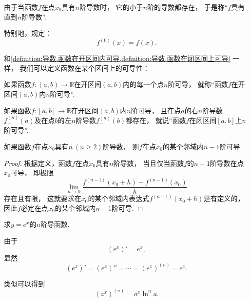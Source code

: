 由于当函数\(f\)在点\(x_0\)具有\(n\)阶导数时，
它的小于\(n\)阶的导数都存在，
于是称“\(f\)具有直到\(n\)阶导数”.

特别地，规定：\begin{equation}
	f^{(0)}(x) = f(x).
\end{equation}

和\cref{definition:导数.函数在开区间内可导,definition:导数.函数在闭区间上可导} 一样，
我们可以定义函数在某个区间上的可导性：
\begin{definition}
如果函数\(f\colon(a,b)\to\mathbb{R}\)在开区间\((a,b)\)内的每一个点\(n\)阶可导，
就称“函数\(f\)在开区间\((a,b)\)内\(n\)阶可导”.
\end{definition}
\begin{definition}
如果函数\(f\colon[a,b]\to\mathbb{R}\)在开区间\((a,b)\)内\(n\)阶可导，
且在点\(a\)的右\(n\)阶导数\(f^{(n)}_+(a)\)及在点\(b\)的左\(n\)阶导数\(f^{(n)}_-(b)\)都存在，
就说“函数\(f\)在闭区间\([a,b]\)上\(n\)阶可导”.
\end{definition}

\begin{proposition}\label{theorem:高阶导数.在一点高阶可导是在该点某邻域内低阶可导的充分条件}
如果函数\(f\)在点\(x_0\)具有\(n\ (n\geq2)\)阶导数，
则\(f\)在点\(x_0\)的某个邻域内\(n-1\)阶可导.
\begin{proof}
根据定义，函数\(f\)在点\(x_0\)具有\(n\)阶导数，
当且仅当函数\(f\)的\(n-1\)阶导数在点\(x_0\)可导，
即极限\begin{equation*}
	\lim_{h\to0} \frac{f^{(n-1)}(x_0+h) - f^{(n-1)}(x_0)}{h}
\end{equation*}存在且有限，
这就要求在\(x_0\)的某个邻域内表达式\(f^{(n-1)}(x_0+h)\)是有定义的，
因此\(f\)必定在点\(x_0\)的某个邻域内\(n-1\)阶可导.
\end{proof}
\end{proposition}

\begin{example}
求\(y = e^x\)的\(n\)阶导函数.
\begin{solution}
由于\begin{equation*}
	(e^x)' = e^x,
\end{equation*}
显然\begin{equation*}
	(e^x)'
	= (e^x)''
	= \dotsb
	= (e^x)^{(n)}
	= e^x.
\end{equation*}
\end{solution}
\end{example}
类似可以得到\begin{equation*}
	(a^x)^{(n)}
	= a^x \ln^n a.
\end{equation*}

